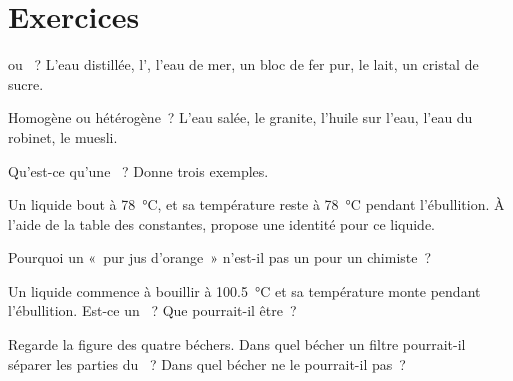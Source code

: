 \section{Exercices}

\begin{exercise}[$\star$]\label{exo:g6:pure-substances-and-mixtures:1}
 ou ~? L'eau distillée, l', l'eau de mer, un bloc de
fer pur, le lait, un cristal de sucre.
\end{exercise}

\begin{exercise}[$\star$]\label{exo:g6:pure-substances-and-mixtures:2}
Homogène ou hétérogène~? L'eau salée, le granite, l'huile sur l'eau,
l'eau du robinet, le muesli.
\end{exercise}

\begin{exercise}[$\star$]\label{exo:g6:pure-substances-and-mixtures:3}
Qu'est-ce qu'une ~? Donne trois exemples.
\end{exercise}

\begin{exercise}[$\star$]\label{exo:g6:pure-substances-and-mixtures:4}
Un liquide bout à \qty{78}{\celsius}, et sa température reste à
\qty{78}{\celsius} pendant l'ébullition. À l'aide de la table des
constantes, propose une identité pour ce liquide.
\end{exercise}

\begin{exercise}[$\star$]\label{exo:g6:pure-substances-and-mixtures:5}
Pourquoi un «~pur jus d'orange~» n'est-il pas un  pour un
chimiste~?
\end{exercise}

\begin{exercise}[$\star\star$]\label{exo:g6:pure-substances-and-mixtures:6}
Un liquide commence à bouillir à \qty{100.5}{\celsius} et sa température
monte pendant l'ébullition. Est-ce un ~? Que pourrait-il être~?
\end{exercise}

\begin{exercise}[$\star\star$]\label{exo:g6:pure-substances-and-mixtures:7}
Regarde la figure des quatre béchers. Dans quel bécher un filtre
pourrait-il séparer les parties du ~? Dans quel bécher ne le
pourrait-il pas~?
\end{exercise}

